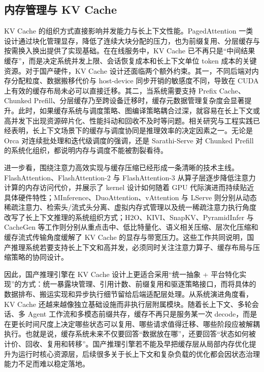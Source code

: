 \subsection{内存管理与 KV Cache}

KV Cache 的组织方式直接影响并发能力与长上下文性能。PagedAttention 一类设计通过块化管理显存，降低了连续大块分配的压力，也为前缀复用、分层缓存与按需换入换出提供了实现基础\citep{kwon2023efficient}。在在线服务中，KV Cache 已不再只是“中间结果缓存”，而是决定系统并发上限、会话恢复成本和长上下文单位 token 成本的关键资源。对于国产硬件，KV Cache 设计还面临两个额外约束。其一，不同后端对内存分配粒度、数据搬移代价与 host-device 同步开销的敏感度不同，导致在 CUDA 上有效的缓存布局未必可以直接迁移。其二，当系统需要支持 Prefix Cache、Chunked Prefill、分层缓存乃至跨设备迁移时，缓存元数据管理复杂度会显著提升。此时，如果缓存系统与调度策略、图编译策略耦合过深，就容易在长上下文或高并发下出现资源碎片化、性能抖动和回收不及时等问题。相关研究与工程实践已经表明，长上下文场景下的缓存与调度协同是推理效率的决定因素之一。无论是 Orca 对连续批处理和迭代级调度的强调，还是 Sarathi-Serve 对 Chunked Prefill 的系统化组织，都说明内存与调度不能被割裂看待\citep{orca2023,sarathi2023}。

进一步看，围绕注意力高效实现与缓存压缩已经形成一条清晰的技术主线。FlashAttention、FlashAttention-2 与 FlashAttention-3 从算子层逐步降低注意力计算的内存访问代价，并展示了 kernel 设计如何随着 GPU 代际演进而持续贴近具体硬件特性\citep{dao2022flashattention,dao2024flashattention2,shah2024flashattention3}；MInference、DuoAttention、vAttention 与 LServe 则分别从动态稀疏注意力、检索头/流式头分离、虚拟内存式管理以及统一稀疏注意力执行角度改写了长上下文推理的系统组织方式\citep{jin2024minference,xiao2024duoattention,kwon2024vattention,yang2025lserve}；H2O、KIVI、SnapKV、PyramidInfer 与 CacheGen 等工作则分别从重点击中、低比特量化、语义相关压缩、层次化压缩和缓存流式传输角度缓解了 KV Cache 的显存与带宽压力\citep{zhang2023h2o,liu2024kivi,li2024snapkv,yang2024pyramidinfer,zhang2024cachegen}。这些工作共同说明，国产推理系统若要支持长上下文和高并发，必须同时关注注意力算子、缓存布局与压缩策略的协同设计。

因此，国产推理引擎在 KV Cache 设计上更适合采用“统一抽象 + 平台特化实现”的方式：统一暴露块管理、引用计数、前缀复用和驱逐策略接口，而将具体的数据排布、搬运实现和异步执行细节留给后端适配层处理。从系统演进角度看，KV Cache 还越来越像独立基础设施而非执行层附属模块。随着长上下文、多轮会话、多 Agent 工作流和多模态前缀共存，缓存不再只是服务某一次 decode，而是在更长时间尺度上决定哪些状态可以复用、哪些请求值得迁移、哪些阶段应被解耦执行。也就是说，缓存系统未来不仅要回答“数据放在哪”，还要回答“状态如何被计价、回收、复用和转移”。国产推理引擎若不能及早把缓存层从局部内存优化提升为运行时核心资源层，后续很多关于长上下文和复杂负载的优化都会因状态治理能力不足而难以稳定落地。

